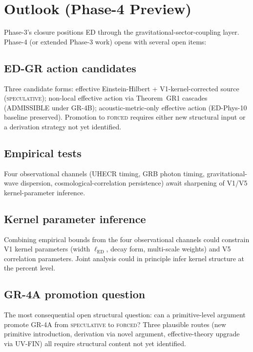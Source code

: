 \documentclass[11pt,a4paper]{article}
\begin{document}
\section{Outlook (Phase-4 Preview)}

Phase-3's closure positions ED through the gravitational-sector-coupling layer. Phase-4 (or extended Phase-3 work) opens with several open items:

\subsection{ED-GR action candidates}

Three candidate forms: effective Einstein-Hilbert + V1-kernel-corrected source (\textsc{speculative}); non-local effective action via Theorem~GR1 cascades (ADMISSIBLE under GR-4B); acoustic-metric-only effective action (ED-Phys-10 baseline preserved). Promotion to \textsc{forced} requires either new structural input or a derivation strategy not yet identified.

\subsection{Empirical tests}

Four observational channels (UHECR timing, GRB photon timing, gravitational-wave dispersion, cosmological-correlation persistence) await sharpening of V1/V5 kernel-parameter inference.

\subsection{Kernel parameter inference}

Combining empirical bounds from the four observational channels could constrain V1 kernel parameters (width $\ell_\mathrm{ED}$, decay form, multi-scale weights) and V5 correlation parameters. Joint analysis could in principle infer kernel structure at the percent level.

\subsection{GR-4A promotion question}

The most consequential open structural question: can a primitive-level argument promote GR-4A from \textsc{speculative} to \textsc{forced}? Three plausible routes (new primitive introduction, derivation via novel argument, effective-theory upgrade via UV-FIN) all require structural content not yet identified.
\end{document}
